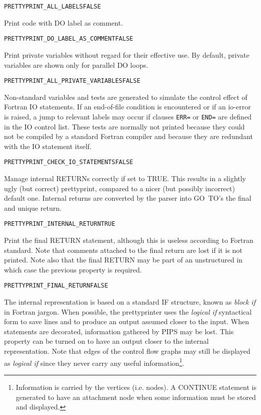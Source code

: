 \documentclass[a4paper]{report}
\newenvironment{PipsProp}{\begin{alltt}}{\end{alltt}}
\begin{document}
\begin{PipsProp}
PRETTYPRINT_ALL_LABELS FALSE
\end{PipsProp}

Print code with DO label as comment.

\begin{PipsProp}
PRETTYPRINT_DO_LABEL_AS_COMMENT FALSE
\end{PipsProp}

Print private variables without regard for their effective use. By
default, private variables are shown only for parallel DO loops.

\begin{PipsProp}
PRETTYPRINT_ALL_PRIVATE_VARIABLES FALSE
\end{PipsProp}

Non-standard variables and tests are generated to simulate the control
effect of Fortran IO statements. If an end-of-file condition is
encountered or if an io-error is raised, a jump to relevant labels may
occur if clauses \verb|ERR=| or \verb|END=| are defined in the IO
control list. These tests are normally not printed because they could
not be compiled by a standard Fortran compiler and because they are
redundant with the IO statement itself.

\begin{PipsProp}
PRETTYPRINT_CHECK_IO_STATEMENTS FALSE
\end{PipsProp}

Manage internal RETURNs correctly if set to TRUE.  This results in a
slightly ugly (but correct) prettyprint, compared to a nicer (but
possibly incorrect) default one. Internal returns are converted by the
parser into GO~TO's the final and unique return.

\begin{PipsProp}
PRETTYPRINT_INTERNAL_RETURN TRUE
\end{PipsProp}

Print the final RETURN statement, although this is useless according to
Fortran standard. Note that comments attached to the final return are
lost if it is not printed. Note also that the final RETURN may be part
of an unstructured in which case the previous property is required.

\begin{PipsProp}
PRETTYPRINT_FINAL_RETURN FALSE
\end{PipsProp}

The internal representation is based on a standard IF structure, known as
{\em block if} in Fortran jargon. When possible, the prettyprinter uses
the {\em logical if} syntactical form to save lines and to produce an
output assumed closer to the input. When statements are decorated,
information gathered by PIPS may be lost. This property can be turned on
to have an output closer to the internal representation. Note that edges
of the control flow graphs may still be displayed as {\em logical if}
since they never carry any useful information\footnote{Information is
carried by the vertices (i.e. nodes). A CONTINUE statement is
generated to have an attachment node when
some information must be stored and displayed.}.
\end{document}
